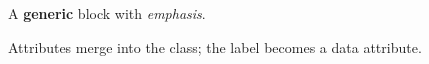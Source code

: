 \begin{warning}
A \textbf{generic} block with \emph{emphasis}.
\end{warning}

\begin{sidebar}
Attributes merge into the class; the label becomes a data attribute.
\end{sidebar}

